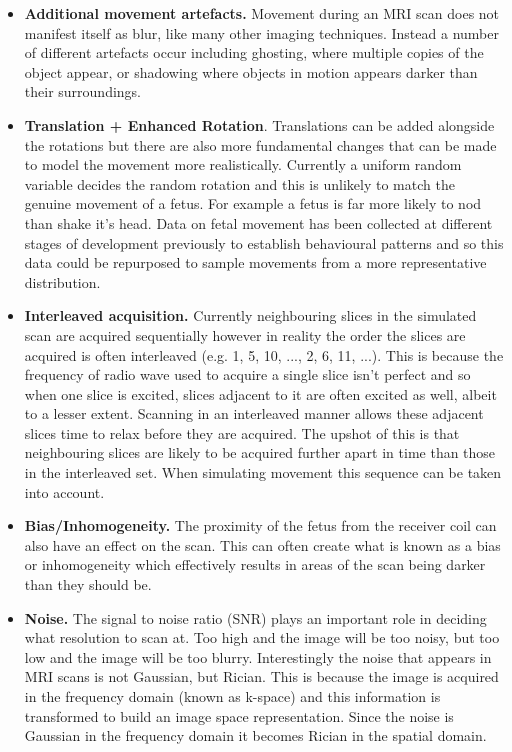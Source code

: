 \begin{itemize}
  \item \textbf{Additional movement artefacts.} Movement during an MRI scan does not manifest itself as blur, like many other imaging techniques. Instead a number of different artefacts occur including ghosting, where multiple copies of the object appear, or shadowing where objects in motion appears darker than their surroundings.

  \item \textbf{Translation + Enhanced Rotation}. Translations can be added alongside the rotations but there are also more fundamental changes that can be made to model the movement more realistically. Currently a uniform random variable decides the random rotation and this is unlikely to match the genuine movement of a fetus. For example a fetus is far more likely to nod than shake it's head. Data on fetal movement has been collected at different stages of development previously to establish behavioural patterns\cite{fetalmovement} and so this data could be repurposed to sample movements from a more representative distribution.

  \item \textbf{Interleaved acquisition.} Currently neighbouring slices in the simulated scan are acquired sequentially however in reality the order the slices are acquired is often interleaved (e.g. 1, 5, 10, ..., 2, 6, 11, ...). This is because the frequency of radio wave used to acquire a single slice isn't perfect and so when one slice is excited, slices adjacent to it are often excited as well, albeit to a lesser extent\cite{basicsofmri}. Scanning in an interleaved manner allows these adjacent slices time to relax before they are acquired. The upshot of this is that neighbouring slices are likely to be acquired further apart in time than those in the interleaved set. When simulating movement this sequence can be taken into account.

  \item \textbf{Bias/Inhomogeneity.} The proximity of the fetus from the receiver coil can also have an effect on the scan. This can often create what is known as a bias or inhomogeneity which effectively results in areas of the scan being darker than they should be.

  \item \textbf{Noise.} The signal to noise ratio (SNR) plays an important role in deciding what resolution to scan at. Too high and the image will be too noisy, but too low and the image will be too blurry. Interestingly the noise that appears in MRI scans is not Gaussian, but Rician. This is because the image is acquired in the frequency domain (known as k-space) and this information is transformed to build an image space representation. Since the noise is Gaussian in the frequency domain it becomes Rician in the spatial domain.
  

\end{itemize}
